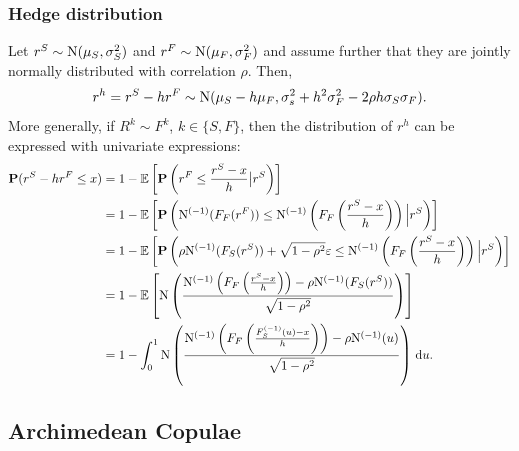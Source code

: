 

    
\subsubsection*{Hedge distribution}
\label{sec:hedge-distribution-gaussian}

Let $r^S\sim {\rm N}(\mu_S, \sigma_S^2)$ and $r^F\sim {\rm N}(\mu_F,
\sigma_F^2)$ and assume further that they are jointly normally
distributed with correlation $\rho$. Then,
\begin{equation*}
  r^h = r^S - h r^F \sim {\rm N}(\mu_S - h \mu_F, \sigma_s^2 + h^2
  \sigma_F^2 - 2\rho h \sigma_S \sigma_F).
\end{equation*}
More generally, if $R^k\sim F^k$, $k\in \{S,F\}$, then the
distribution of $r^h$ can be expressed with univariate
expressions: 
\begin{align*}
  \p(r^S-h r^F\leq x)
  &= 1-\E\left[ \p\left(r^F\leq \frac{r^S-x}{h}\big| r^S\right)\right] \\ %
  &= 1-\E\left[\p \left(\Ncdf^{(-1)}(F_F(r^F)) \leq
    \Ncdf^{(-1)}\left(F_F\left(\frac{r^S-x}{h}\right)\right) \Big|
    r^S\right)\right] \\%
  &= 1-\E\left[ \p\left(\rho \Ncdf^{(-1)}(F_S(r^S)) + \sqrt{1-\rho^2}
    \varepsilon \leq \Ncdf^{(-1)}\left(F_F\left(\frac{r^S-x}{h}\right)\right) \Big|
    r^S\right)\right]\\ %
  &= 1-\E\left[ \Ncdf \left(
    \frac{\Ncdf^{(-1)}\left(F_F\left(\frac{r^S-x}{h}\right)\right) -\rho
    \Ncdf^{(-1)}(F_S(r^S))} { \sqrt{1-\rho^2}}\right)\right]\\
  &= 1-\int_0^1  \Ncdf \left(
    \frac{\Ncdf^{(-1)}\left(F_F\left(\frac{F_S^{(-1)}(u)-x}{h}\right)\right) -\rho
    \Ncdf^{(-1)}(u)} { \sqrt{1-\rho^2}}\right) \,\dd u.
\end{align*}



\subsection{Archimedean Copulae}
\label{sec:archimedean-copulas}

